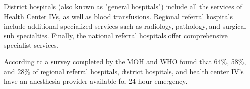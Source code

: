 \documentclass[12pt]{article} %
\begin{document}
District hospitals (also known as "general hospitals") include all the services of Health Center IVs, as well as blood transfusions.
Regional referral hospitals include additional specialized services such as radiology, pathology, and surgical sub specialties.
Finally, the national referral hospitals offer comprehensive specialist services. 
\cite{UBS2017}

According to a survey completed by the MOH and WHO found that 64\%, 58\%, and 28\% of regional referral hospitals, district hospitals, and health center IV's have an anesthesia provider available for 24-hour emergency. 
\citet{hcsurvey2014}






\end{document}
